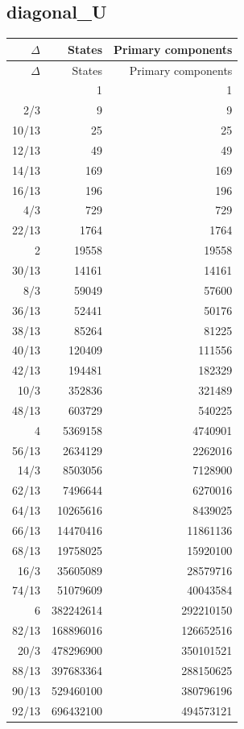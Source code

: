 \subsection{diagonal\_U}

\begingroup\small
\setlength{\tabcolsep}{5pt}
\begin{longtable}{@{}rrr@{}}
\toprule
$\Delta$ & States & Primary components\\
\midrule\endfirsthead
\toprule
$\Delta$ & States & Primary components\\
\midrule\endhead
\bottomrule\endfoot
0 & 1 & 1\\
2/3 & 9 & 9\\
10/13 & 25 & 25\\
12/13 & 49 & 49\\
14/13 & 169 & 169\\
16/13 & 196 & 196\\
4/3 & 729 & 729\\
22/13 & 1764 & 1764\\
2 & 19558 & 19558\\
30/13 & 14161 & 14161\\
8/3 & 59049 & 57600\\
36/13 & 52441 & 50176\\
38/13 & 85264 & 81225\\
40/13 & 120409 & 111556\\
42/13 & 194481 & 182329\\
10/3 & 352836 & 321489\\
48/13 & 603729 & 540225\\
4 & 5369158 & 4740901\\
56/13 & 2634129 & 2262016\\
14/3 & 8503056 & 7128900\\
62/13 & 7496644 & 6270016\\
64/13 & 10265616 & 8439025\\
66/13 & 14470416 & 11861136\\
68/13 & 19758025 & 15920100\\
16/3 & 35605089 & 28579716\\
74/13 & 51079609 & 40043584\\
6 & 382242614 & 292210150\\
82/13 & 168896016 & 126652516\\
20/3 & 478296900 & 350101521\\
88/13 & 397683364 & 288150625\\
90/13 & 529460100 & 380796196\\
92/13 & 696432100 & 494573121\\

\end{longtable}
